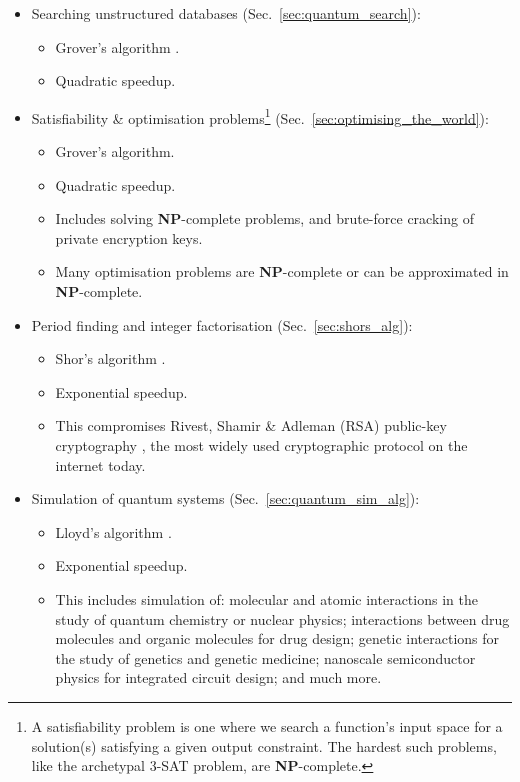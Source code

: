 \begin{itemize}
	\item Searching unstructured databases (Sec.~\ref{sec:quantum_search}):
		\begin{itemize}
		\item Grover's algorithm \cite{bib:Grover96}.
		\item Quadratic speedup.
		\end{itemize}
	\item Satisfiability \& optimisation problems\footnote{A satisfiability problem is one where we search a function's input space for a solution(s) satisfying a given output constraint. The hardest such problems, like the archetypal 3-\textsc{SAT} problem, are \textbf{NP}-complete.} (Sec.~\ref{sec:optimising_the_world}):
		\begin{itemize}
			\item Grover's algorithm.
			\item Quadratic speedup.
			\item Includes solving \textbf{NP}-complete problems, and brute-force cracking of private encryption keys.
			\item Many optimisation problems are \textbf{NP}-complete or can be approximated in \textbf{NP}-complete.
			\end{itemize}
	\item Period finding and integer factorisation (Sec.~\ref{sec:shors_alg}):
		\begin{itemize}
		\item Shor's algorithm \cite{bib:ShorFactor}.
		\item Exponential speedup.
		\item This compromises Rivest, Shamir \& Adleman (RSA) public-key cryptography \cite{bib:RSA}, the most widely used cryptographic protocol on the internet today.
		\end{itemize}
	\item Simulation of quantum systems (Sec.~\ref{sec:quantum_sim_alg}):
		\begin{itemize}
			\item Lloyd's algorithm \cite{bib:lloyd1996universal}.
			\item Exponential speedup.
			\item This includes simulation of: molecular and atomic interactions in the study of quantum chemistry or nuclear physics; interactions between drug molecules and organic molecules for drug design; genetic interactions for the study of genetics and genetic medicine; nanoscale semiconductor physics for integrated circuit design; and much more.

\end{itemize}
\end{itemize}

